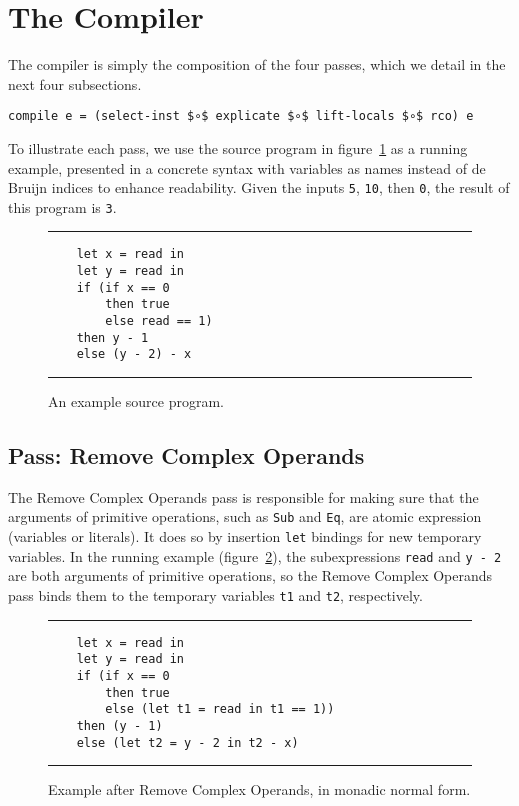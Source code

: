 \documentclass[sigplan,review,dvipsnames,screen,10pt]{acmart}
\begin{document}
\section{The Compiler}
\label{sec:compiler}

The compiler is simply the composition of the four passes,
which we detail in the next four subsections.

\begin{lstlisting}[basicstyle=\ttfamily\footnotesize]
compile e = (select-inst $∘$ explicate $∘$ lift-locals $∘$ rco) e
\end{lstlisting}

To illustrate each pass, we use the source program in
figure~\ref{fig:running-example-source} as a running example,
presented in a concrete syntax with variables as names instead of de
Bruijn indices to enhance readability.  Given the inputs
\lstinline{5}, \lstinline{10}, then \lstinline{0}, the result of this
program is \lstinline{3}.

\begin{figure}[tp]
  \hrule
\begin{lstlisting}
    let x = read in
    let y = read in
    if (if x == 0
        then true
        else read == 1)
    then y - 1
    else (y - 2) - x
\end{lstlisting}
  \hrule
\caption{An example source program.}
\label{fig:running-example-source}
\end{figure}

\subsection{Pass: Remove Complex Operands}

The Remove Complex Operands pass is responsible for making sure that
the arguments of primitive operations, such as \lstinline{Sub} and
\lstinline{Eq}, are atomic expression (variables or literals). It does
so by insertion \lstinline{let} bindings for new temporary variables.
In the running example (figure~\ref{fig:running-example-monadic}), the
subexpressions \lstinline{read} and \lstinline{y - 2} are both
arguments of primitive operations, so the Remove Complex Operands pass
binds them to the temporary variables \lstinline{t1} and
\lstinline{t2}, respectively.

\begin{figure}[tp]
  \hrule
\begin{lstlisting}
    let x = read in
    let y = read in
    if (if x == 0
        then true
        else (let t1 = read in t1 == 1))
    then (y - 1)
    else (let t2 = y - 2 in t2 - x)
\end{lstlisting}
  \hrule
\caption{Example after Remove Complex Operands, in
  monadic normal form.}
\label{fig:running-example-monadic}
\end{figure}
\end{document}
